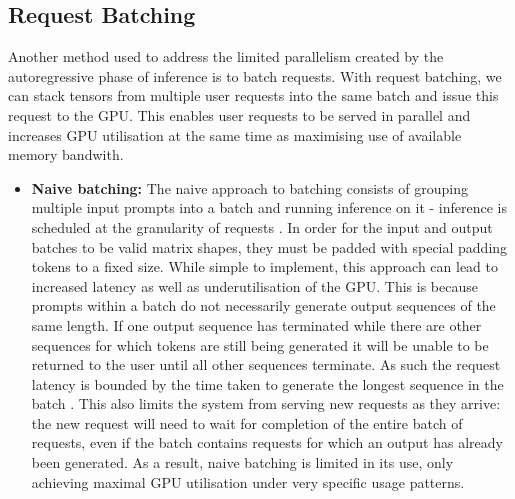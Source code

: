 \documentclass[12pt,twoside]{report}
\begin{document}
\subsection{Request Batching}
Another method used to address the limited parallelism created by the autoregressive phase of inference is to batch requests. 
With request batching, we can stack tensors from multiple user requests into the same batch and issue this request to the GPU.
This enables user requests to be served in parallel and increases GPU utilisation at the same time as maximising use of available memory bandwith.

\begin{itemize}
  \item \textbf{Naive batching:} The naive approach to batching consists of grouping multiple input prompts into a batch and running inference on it - inference is scheduled at the granularity of requests \cite{yu2022orca}.
    In order for the input and output batches to be valid matrix shapes, they must be padded with special padding tokens to a fixed size.
    While simple to implement, this approach can lead to increased latency as well as underutilisation of the GPU. 
    This is because prompts within a batch do not necessarily generate output sequences of the same length. 
    If one output sequence has terminated while there are other sequences for which tokens are still being generated it will be unable to be returned to the user until all other sequences terminate.
    As such the request latency is bounded by the time taken to generate the longest sequence in the batch \cite{yu2022orca}.
    This also limits the system from serving new requests as they arrive: the new request will need to wait for completion of the entire batch of requests, even if the batch contains requests for which an output has already been generated.
    As a result, naive batching is limited in its use, only achieving maximal GPU utilisation under very specific usage patterns.


\end{itemize}
\end{document}
